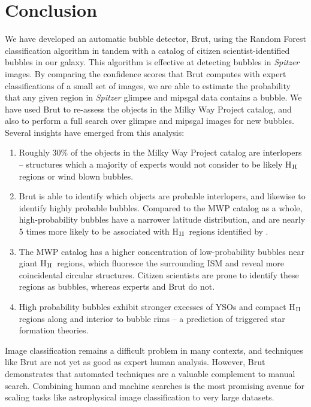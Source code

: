 \documentclass[preprint]{aastex}
\newcommand{\hii}[0]{H$_{\rm II}$}
\begin{document}
\section{Conclusion}
\label{sec:conclusion}
We have developed an automatic bubble detector, Brut, using the Random Forest classification algorithm in tandem with a catalog of citizen scientist-identified bubbles in our galaxy. This algorithm is effective at detecting bubbles in \emph{Spitzer} images. By comparing the confidence scores that Brut computes with expert classifications of a small set of images, we are able to estimate the probability that any given region in \emph{Spitzer} {\sc glimpse} and {\sc mipsgal} data contains a bubble. We have used Brut to re-assess the objects in the Milky Way Project catalog, and also to perform a full search over {\sc glimpse} and {\sc mipsgal} images for new bubbles.  Several insights have emerged from this analysis:
\begin{enumerate}
\item Roughly 30\% of the objects in the Milky Way Project catalog are interlopers -- structures which a majority of experts would not consider to be likely \hii\, regions or wind blown bubbles.
\item Brut is able to identify which objects are probable interlopers, and likewise to identify highly probable bubbles. Compared to the MWP catalog as a whole, high-probability bubbles have a narrower latitude distribution, and are nearly 5 times more likely to be associated with \hii\, regions identified by \cite{Anderson11}.
\item The MWP catalog has a higher concentration of low-probability bubbles near giant \hii\, regions, which fluoresce the surrounding ISM and reveal more coincidental circular structures. Citizen scientists are prone to identify these regions as bubbles, whereas experts and Brut do not.
\item High probability bubbles  exhibit stronger excesses of YSOs and compact \hii\, regions along and interior to bubble rims -- a prediction of triggered star formation theories.
\end{enumerate}

Image classification remains a difficult problem in many contexts, and techniques like Brut are not yet as good as expert human analysis. However, Brut demonstrates that automated techniques are a valuable complement to manual search.  Combining human and machine searches is the most promising avenue for scaling tasks like astrophysical image classification to very large datasets.
\end{document}
